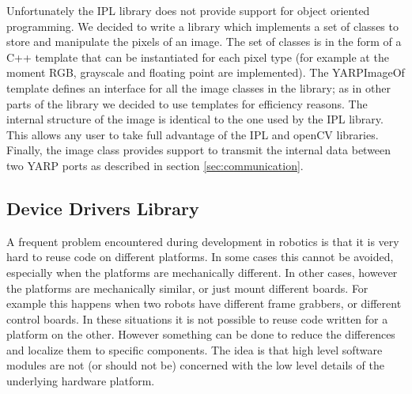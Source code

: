 Unfortunately the IPL library does not provide support for object oriented programming. We decided to write a library which implements a set of classes to store and manipulate the pixels of an image. The set of classes is in the form of a C++ template that can be instantiated for each pixel type (for example at the moment RGB, grayscale and floating point are implemented). The YARPImageOf template defines an interface for all the image classes in the library; as in other parts of the library we decided to use templates for efficiency reasons. The internal structure of the image is identical to the one used by the IPL library. This allows any user to take full advantage of the IPL and openCV libraries. Finally, the image class provides support to transmit the internal data between two YARP ports as described in section \ref{sec:communication}.

\subsection{Device Drivers Library}
A frequent problem encountered during development in robotics is that it is very hard to reuse code on different platforms. In some cases this cannot be avoided, especially when the platforms are mechanically different. In other cases, however the platforms are mechanically similar, or just mount different boards. For example this happens when two robots have different frame grabbers, or different control boards. In these situations it is not possible to reuse code written for a platform on the other. However something can be done to reduce the differences and localize them to specific components. The idea is that high level software modules are not (or should not be) concerned with the low level details of the underlying hardware platform. 

